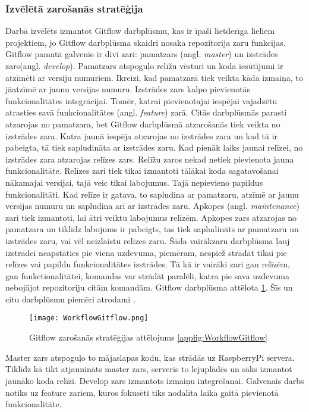 \subsubsection{Izvēlētā zarošanās stratēģija}
Darbā izvēlēts izmantot Gitflow darbplūsmu, kas ir īpaši lietderīga lieliem projektiem, jo Gitflow darbplūsma skaidri nosaka repozitorija zaru funkcijas. Gitflow pamatā galvenie ir divi zari: pamatzars (angl. \textit{master}) un izstrādes zars(angl. \textit{develop}). Pamatzars atspoguļo relīžu vēsturi un koda iesūtījumi ir atzīmēti ar versiju numuriem. Ikreizi, kad pamatzarā tiek veikta kāda izmaiņa, to jāatzīmē ar jaunu versijas numuru. Izstrādes zars kalpo pievienotās funkcionalitātes integrācijai. Tomēr, katrai pievienotajai iespējai vajadzētu atrasties savā funkcionalitātes (angl. \textit{feature}) zarā. Citās darbplūsmās parasti atzarojas no pamatzara, bet Gitflow darbplūsmā atzarošanās tiek veikta no izstrādes zara. Katra jaunā iespēja atzarojas no izstrādes zara un kad tā ir pabeigta, tā tiek sapludināta ar izstrādes zaru.
Kad pienāk laiks jaunai relīzei, no izstrādes zara atzarojas relīzes zars. Relīžu zaros nekad netiek pievienota jauna funkcionalitāte. Relīzes zari tiek tikai izmantoti tālākai koda sagatavošanai nākamajai versijai, tajā veic tikai labojumus. Tajā nepievieno papildus funkcionalitāti. Kad relīze ir gatava, to sapludina ar pamatzaru, atzīmē ar jaunu versijas numuru un sapludina arī ar izstrādes zaru.
Apkopes (angl. \textit{maintenance}) zari tiek izmantoti, lai ātri veiktu labojumus relīzēm. Apkopes zars atzarojas no pamatzara un tiklīdz labojums ir pabeigts, tas tiek sapludināts ar pamatzaru un izstrādes zaru, vai vēl neizlaistu relīzes zaru.
Šāda vairākzaru darbplūsma ļauj izstrādei neapstāties pie viena uzdevuma, piemēram, nespiež strādāt tikai pie relīzes vai papildu funkcionalitātes izstrādes. Tā kā ir vairāki zari gan relīzēm, gan funkctionalitātei, komandas var strādāt paralēli, katra pie sava uzdevuma nebojājot repozitoriju citām komandām.
Gitflow darbplūsma attēlota \ref{fig:WorkflowGitflow}. Šīs un citu darbplūsmu piemēri atrodami \cite{workflow-comparison}.
\begin{figure}[H]%
	\centering
	\captionsetup{justification=centering}
	\texttt{[image: WorkflowGitflow.png]}
	\caption{Gitflow zarošanās stratēģijas attēlojums \ref{appfig:WorkflowGitflow}}
	\label{fig:WorkflowGitflow}
\end{figure}
Master zars atspoguļo to mājaslapas kodu, kas strādās uz RaspberryPi servera. Tiklīdz kā tikt atjaunināts master zars, serveris to lejuplādēs un sāks izmantot jaunāko koda relīzi.
Develop zars izmantots izmaiņu integrēšanai.
Galvenais darbs notiks uz feature zariem, kuros fokusēti tiks nodalīta laika gaitā pievienotā funkcionalitāte.



